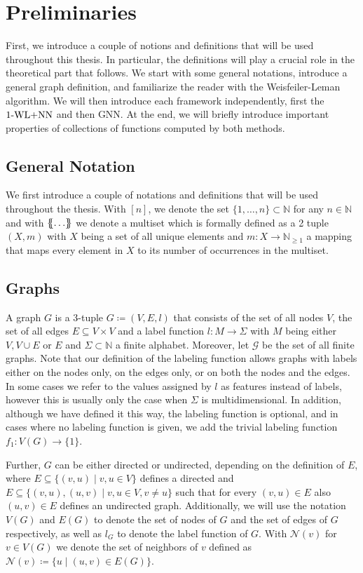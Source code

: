 \section{Preliminaries}
First, we introduce a couple of notions and definitions that will be used throughout this thesis. In particular, the definitions will play a crucial role in the theoretical part that follows. We start with some general notations, introduce a general graph definition, and familiarize the reader with the Weisfeiler-Leman algorithm. We will then introduce each framework independently, first the $\text{1-WL+NN}$ and then GNN. At the end, we will briefly introduce important properties of collections of functions computed by both methods.

\subsection{General Notation}
We first introduce a couple of notations and definitions that will be used throughout the thesis. With $[n]$, we denote the set $\{1, \ldots, n\} \subset \mathbb{N}$ for any $n \in \mathbb{N}$ and with $\{\!\!\{ \ldots \}\!\!\}$ we denote a multiset which is formally defined as a 2 tuple $(X, m)$ with $X$ being a set of all unique elements and $m: X \rightarrow \mathbb{N}_{\geq 1}$ a mapping that maps every element in $X$ to its number of occurrences in the multiset.

\subsection{Graphs}
A graph $G$ is a 3-tuple $G\coloneqq (V, E, l)$ that consists of the set of all nodes $V$, the set of all edges $E \subseteq V \times V$ and a label function $l: M \rightarrow \Sigma$ with $M$ being either $V, V \cup E$ or $E$ and $\Sigma \subset \mathbb{N}$ a finite alphabet. Moreover, let $\mathcal{G}$ be the set of all finite graphs. Note that our definition of the labeling function allows graphs with labels either on the nodes only, on the edges only, or on both the nodes and the edges. In some cases we refer to the values assigned by $l$ as features instead of labels, however this is usually only the case when $\Sigma$ is multidimensional. In addition, although we have defined it this way, the labeling function is optional, and in cases where no labeling function is given, we add the trivial labeling function $f_1: V(G) \rightarrow \{1\}$.

Further, $G$ can be either directed or undirected, depending on the definition of $E$, where $E \subseteq \{(v,u) \mid v,u \in V\}$ defines a directed and $E \subseteq \{(v, u), (u,v) \mid v,u \in V, v\neq u\}$ such that for every $(v,u) \in E$ also $(u,v) \in E$ defines an undirected graph. Additionally, we will use the notation $V(G)$ and $E(G)$ to denote the set of nodes of $G$ and the set of edges of $G$ respectively, as well as $l_G$ to denote the label function of $G$. With $\mathcal{N}(v)$ for $v \in V(G)$ we denote the set of neighbors of $v$ defined as $\mathcal{N}(v) \coloneqq \{u \mid (u, v) \in E(G)\}$.

